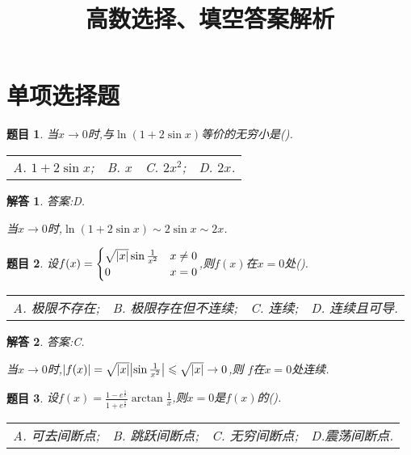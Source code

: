 \documentclass[a4paper,oneside,12pt]{ctexart}
\title{高数选择、填空答案解析}
\date{}
\author{}
\theoremstyle{plain}
\newtheorem{task}{题目}[section]
\theoremstyle{nonumberplain}
\newtheorem{solution}{解答}
\theoremstyle{nonumberplain}
\theoremstyle{nonumberplain}
\theoremstyle{nonumberbreak}
\begin{document}
    
    \maketitle

    \section{单项选择题}

    \begin{task}
        \label{ts:1.1}
        当$x\to 0$时,与$\ln(1+2\sin x)$等价的无穷小是(\qquad).

        \begin{tabular}{llll}
            A. $1+2\sin x$; & B. $x$ & C. $2x^2$; & D. $2x$.
        \end{tabular}
    \end{task}

    \begin{solution}
        答案:D.

        当$x\to 0$时,$\ln(1+2\sin x)\sim 2\sin x\sim 2x$.
    \end{solution}

    \begin{task}
        \label{ts:1.2}
        设$f(x)=\begin{cases}
            \sqrt{\abs{x}}\sin\frac{1}{x^2}& x\neq 0\\
            0 & x=0
        \end{cases}$,则$f(x)$在$x=0$处(\qquad).

        \begin{tabular}{llll}
            A. 极限不存在; & B. 极限存在但不连续; & C. 连续; & D. 连续且可导.
        \end{tabular}
    \end{task}

    \begin{solution}
        答案:C.

        当$x\to 0$时,$\abs{f(x)}=\sqrt{\abs{x}}\abs{\sin\frac{1}{x^2}}\leqslant \sqrt{\abs{x}}\to 0$,则
        $f$在$x=0$处连续.
    \end{solution}

    \begin{task}
        \label{ts:1.3}
        设$f(x)=\frac{1-e^{\frac{1}{x}}}{1+e^{\frac{1}{x}}}\arctan \frac{1}{x}$,则$x=0$是$f(x)$的(\qquad).

        \begin{tabular}{llll}
            A. 可去间断点; & B. 跳跃间断点; & C. 无穷间断点; & D.震荡间断点.
        \end{tabular}
    \end{task}
\end{document}
